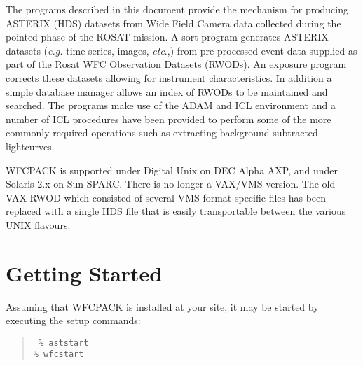 
The programs described in this document provide the mechanism for
producing ASTERIX (HDS) datasets from Wide Field Camera data collected
during the pointed phase of the ROSAT mission. A sort program generates
ASTERIX datasets ({\em e.g.\/} time series, images, {\em etc}.,) from
pre-processed event data supplied as part of the Rosat WFC Observation
Datasets (RWODs). An exposure program corrects these datasets allowing
for instrument characteristics. In addition a simple database manager
allows an index of RWODs to be maintained and searched.  The programs
make use of the ADAM and ICL environment and a number of ICL procedures
have been provided to perform some of the more commonly required
operations such as extracting background subtracted lightcurves.

WFCPACK is supported under Digital Unix on DEC Alpha AXP, and under
Solaris 2.x on Sun SPARC.  There is no longer a VAX/VMS version.  The
old VAX RWOD which consisted of several VMS format specific files has
been replaced with a single HDS file that is easily transportable
between the various UNIX flavours.

 \newpage
 \begin{latexonly}
   \setlength{\parskip}{0mm}
   \latexonlytoc
   \setlength{\parskip}{\medskipamount}
   \markright{\stardocname}
 \end{latexonly}
\newpage
\renewcommand{\thepage}{\arabic{page}}
\setcounter{page}{1}

\section{Getting Started}
\label{sec:staring}

Assuming that WFCPACK is installed at your site, it may be started
by executing the setup commands:

\begin{quote} {\tt
\% aststart \\
\% wfcstart}
\end{quote}

